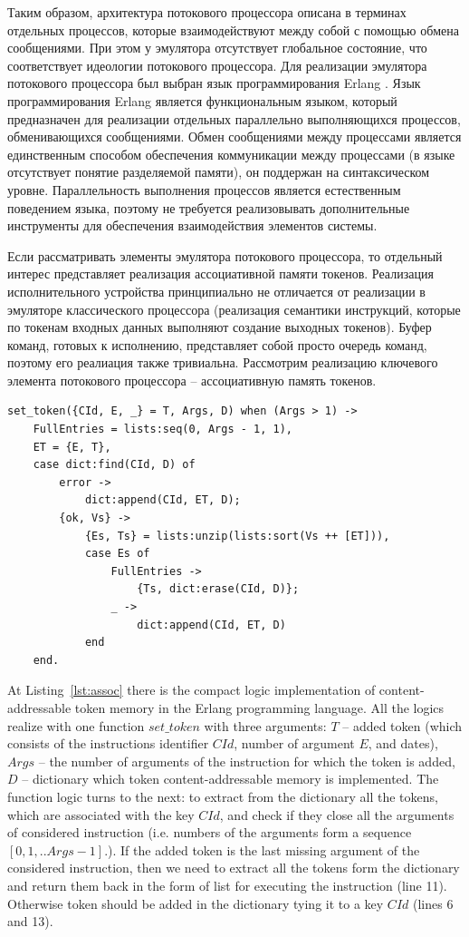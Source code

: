 \documentclass[
11pt,%
tightenlines,%
twoside,%
onecolumn,%
nofloats,%
nobibnotes,%
nofootinbib,%
superscriptaddress,%
noshowpacs,%
centertags]%
{revtex4}
\begin{document}
Таким образом, архитектура потокового процессора описана в терминах отдельных процессов, которые взаимодействуют между собой с помощью обмена сообщениями.
При этом у эмулятора отсутствует глобальное состояние, что соответствует идеологии потокового процессора.
Для реализации эмулятора потокового процессора был выбран язык программирования Erlang \cite{Armstrong,Cesarini}.
Язык программирования Erlang является функциональным языком, который предназначен для реализации отдельных параллельно выполняющихся процессов, обменивающихся сообщениями.
Обмен сообщениями между процессами является единственным способом обеспечения коммуникации между процессами (в языке отсутствует понятие разделяемой памяти), он поддержан на синтаксическом уровне.
Параллельность выполнения процессов является естественным поведением языка, поэтому не требуется реализовывать дополнительные инструменты для обеспечения взаимодействия элементов системы.

Если рассматривать элементы эмулятора потокового процессора, то отдельный интерес представляет реализация ассоциативной памяти токенов.
Реализация исполнительного устройства принципиально не отличается от реализации в эмуляторе классического процессора (реализация семантики инструкций, которые по токенам входных данных выполняют создание выходных токенов).
Буфер команд, готовых к исполнению, представляет собой просто очередь команд, поэтому его реалиация также тривиальна.
Рассмотрим реализацию ключевого элемента потокового процессора -- ассоциативную память токенов.

\begin{lstlisting}[caption={Implementation of the logic of the contest-addressable token memory.},label={lst:assoc}]
set_token({CId, E, _} = T, Args, D) when (Args > 1) ->
	FullEntries = lists:seq(0, Args - 1, 1),
	ET = {E, T},
	case dict:find(CId, D) of
		error ->
			dict:append(CId, ET, D);
		{ok, Vs} ->
			{Es, Ts} = lists:unzip(lists:sort(Vs ++ [ET])),
			case Es of
				FullEntries ->
					{Ts, dict:erase(CId, D)};
				_ ->
					dict:append(CId, ET, D)
			end
	end.
\end{lstlisting}

At Listing~\ref{lst:assoc} there is the compact logic implementation of content-addressable token memory in the Erlang programming language.
All the logics realize with one function $set\_token$ with three arguments: $T$ -- added token (which consists of the instructions identifier $CId$, number of argument $E$, and dates), $Args$ -- the number of arguments of the instruction for which the token is added, $D$ -- dictionary which token content-addressable memory is implemented.
The function logic turns to the next: to extract from the dictionary all the tokens, which are associated with the key $CId$, and check if they close all the arguments of considered instruction (i.e. numbers of the arguments form a sequence $[0, 1, .. Args - 1]$.).
If the added token is the last missing argument of the considered instruction, then we need to extract all the tokens form the dictionary and return them back in the form of list for executing the instruction (line 11).
Otherwise token should be added in the dictionary tying it to a key $CId$ (lines 6 and 13).
\end{document}
